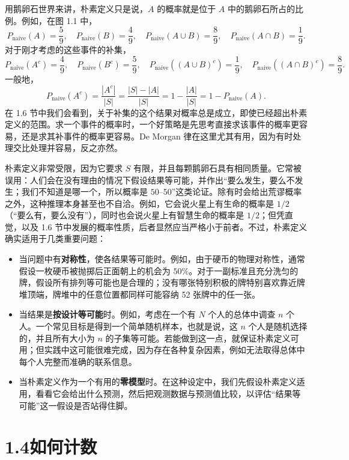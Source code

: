 \documentclass[UTF8, 12pt, fontset=fandol, oneside]{ctexart}
\begin{document}
用鹅卵石世界来讲，朴素定义只是说，$A$ 的概率就是位于 $A$ 中的鹅卵石所占的比例。例如，在图 1.1 中，
\[
  P_{\text{naive}}(A)=\frac59,\quad
  P_{\text{naive}}(B)=\frac49,\quad
  P_{\text{naive}}(A\cup B)=\frac89,\quad
  P_{\text{naive}}(A\cap B)=\frac19.
\]
对于刚才考虑的这些事件的补集，
\[
  P_{\text{naive}}(A^c)=\frac49,\quad
  P_{\text{naive}}(B^c)=\frac59,\quad
  P_{\text{naive}}((A\cup B)^c)=\frac19,\quad
  P_{\text{naive}}((A\cap B)^c)=\frac89.
\]
一般地，
\[
  P_{\text{naive}}(A^c)
  =\frac{|A^c|}{|S|}
  =\frac{|S|-|A|}{|S|}
  =1-\frac{|A|}{|S|}
  =1-P_{\text{naive}}(A).
\]
在 1.6 节中我们会看到，关于补集的这个结果对概率总是成立，即使已经超出朴素定义的范围。求一个事件的概率时，一个好策略是先思考直接求该事件的概率更容易，还是求其补事件的概率更容易。De Morgan 律在这里尤其有用，因为有时处理交比处理并容易，反之亦然。

朴素定义非常受限，因为它要求 $S$ 有限，并且每颗鹅卵石具有相同质量。它常被误用：人们会在没有理由的情况下假设结果等可能，并作出“要么发生，要么不发生；我们不知道是哪一个，所以概率是 $50$--$50$”这类论证。除有时会给出荒谬概率之外，这种推理本身甚至也不自洽。例如，它会说火星上有生命的概率是 $1/2$（“要么有，要么没有”），同时也会说火星上有智慧生命的概率是 $1/2$；但凭直觉，以及 1.6 节中发展的概率性质，后者显然应当严格小于前者。不过，朴素定义确实适用于几类重要问题：
\begin{itemize}
  \item 当问题中有\textbf{对称性}，使各结果等可能时。例如，由于硬币的物理对称性，通常假设一枚硬币被抛掷后正面朝上的机会为 $50\%$。对于一副标准且充分洗匀的牌，假设所有排列等可能也是合理的；没有哪张特别积极的牌特别喜欢靠近牌堆顶端，牌堆中的任意位置都同样可能容纳 52 张牌中的任一张。
  \item 当结果是\textbf{按设计等可能}时。例如，考虑在一个有 $N$ 个人的总体中调查 $n$ 个人。一个常见目标是得到一个简单随机样本，也就是说，这 $n$ 个人是随机选择的，并且所有大小为 $n$ 的子集等可能。若能做到这一点，就保证朴素定义可用；但实践中这可能很难完成，因为存在各种复杂因素，例如无法取得总体中每个人完整而准确的联系信息。
  \item 当朴素定义作为一个有用的\textbf{零模型}时。在这种设定中，我们先假设朴素定义适用，看看它会给出什么预测，然后把观测数据与预测值比较，以评估“结果等可能”这一假设是否站得住脚。
\end{itemize}

\section*{1.4\quad 如何计数}
\end{document}
